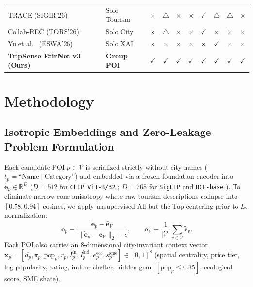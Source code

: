 \documentclass[final,5p,twocolumn]{elsarticle}
\begin{document}
\begin{table}[t]
{\begin{tabular}{llcccccccc}
TRACE \cite{banerjee2026trace} (SIGIR'26) & Solo Tourism & $\times$ & $\triangle$ & $\times$ & $\times$ & $\checkmark$ & $\triangle$ & $\triangle$ & $\times$ \\
Collab-REC \cite{banerjee2026collabrec} (TORS'26) & Solo City & $\times$ & $\triangle$ & $\times$ & $\times$ & $\checkmark$ & $\times$ & $\times$ & $\times$ \\
Yu et al.\ \cite{yu2026finegrained} (ESWA'26) & Solo XAI & $\times$ & $\times$ & $\times$ & $\times$ & $\times$ & $\checkmark$ & $\times$ & $\times$ \\
\midrule
\textbf{TripSense-FairNet v3 (Ours)} & \textbf{Group POI} & \textbf{$\checkmark$} & \textbf{$\checkmark$} & \textbf{$\checkmark$} & \textbf{$\checkmark$} & \textbf{$\checkmark$} & \textbf{$\checkmark$} & \textbf{$\checkmark$} & \textbf{$\checkmark$} \\
\bottomrule
\end{tabular}}
\end{table}

\section{Methodology}
\label{sec:method}
\subsection{Isotropic Embeddings and Zero-Leakage Problem Formulation}
Each candidate POI $p \in \mathcal{V}$ is serialized strictly without city names ($t_p = \text{``}\text{Name} \mid \text{Category}\text{''}$) and embedded via a frozen foundation encoder into $\tilde{\mathbf{e}}_p \in \mathbb{R}^D$ ($D{=}512$ for \texttt{CLIP ViT-B/32} \cite{radford2021learning}; $D{=}768$ for \texttt{SigLIP} \cite{zhai2023sigmoid} and \texttt{BGE-base} \cite{xiao2023bge}). To eliminate narrow-cone anisotropy where raw tourism descriptions collapse into $[0.78, 0.94]$ cosines, we apply unsupervised All-but-the-Top centering \cite{mu2018all} prior to $L_2$ normalization:
\begin{equation}
\mathbf{e}_p = \frac{\tilde{\mathbf{e}}_p - \bar{\mathbf{e}}_{\mathcal{V}}}{\|\tilde{\mathbf{e}}_p - \bar{\mathbf{e}}_{\mathcal{V}}\|_2 + \epsilon}, \qquad \bar{\mathbf{e}}_{\mathcal{V}} = \frac{1}{|\mathcal{V}|}\sum_{v \in \mathcal{V}} \tilde{\mathbf{e}}_v.
\label{eq:center}
\end{equation}
Each POI also carries an 8-dimensional city-invariant context vector $\mathbf{x}_p = [d_p, \pi_p, \text{pop}_p, r_p, I^{\text{in}}_p, I^{\text{hid}}_p, e^{\text{eco}}_p, s^{\text{sme}}_p] \in [0,1]^8$ (spatial centrality, price tier, log popularity, rating, indoor shelter, hidden gem $\mathbb{I}[\text{pop}_p \le 0.35]$, ecological score, SME share).
\end{document}
